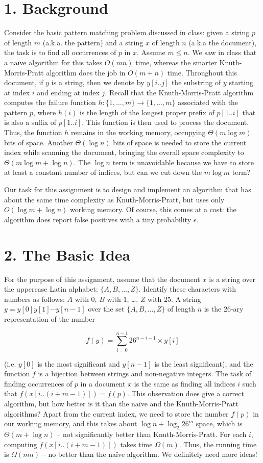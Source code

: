 \documentclass{article}
\begin{document}
\section*{1. Background}
Consider the basic pattern matching problem discussed in class: given a string $p$ of length $m$ (a.k.a. the pattern) and a string $x$ of length $n$ (a.k.a the document), the task is to find all occurrences of $p$ in $x$. Assume $m \leq n$. We saw in class that a naïve algorithm for this takes $O(mn)$ time, whereas the smarter Knuth-Morris-Pratt algorithm does the job in $O(m + n)$ time. Throughout this document, if $y$ is a string, then we denote by $y[i..j]$ the substring of $y$ starting at index $i$ and ending at index $j$. Recall that the Knuth-Morris-Pratt algorithm computes the failure function $h: \{1, \dots, m\} \to \{1, \dots, m\}$ associated with the pattern $p$, where $h(i)$ is the length of the longest proper prefix of $p[1..i]$ that is also a suffix of $p[1..i]$. This function is then used to process the document. Thus, the function $h$ remains in the working memory, occupying $\Theta(m \log m)$ bits of space. Another $\Theta(\log n)$ bits of space is needed to store the current index while scanning the document, bringing the overall space complexity to $\Theta(m \log m + \log n)$. The $\log n$ term is unavoidable because we have to store at least a constant number of indices, but can we cut down the $m \log m$ term?

Our task for this assignment is to design and implement an algorithm that has about the same time complexity as Knuth-Morris-Pratt, but uses only $O(\log m + \log n)$ working memory. Of course, this comes at a cost: the algorithm does report false positives with a tiny probability $\epsilon$.

\section*{2. The Basic Idea}
For the purpose of this assignment, assume that the document $x$ is a string over the uppercase Latin alphabet: $\{A, B, \dots, Z\}$. Identify these characters with numbers as follows: $A$ with $0$, $B$ with $1$, \dots, $Z$ with $25$. A string $y = y[0]y[1]\cdots y[n-1]$ over the set $\{A, B, \dots, Z\}$ of length $n$ is the 26-ary representation of the number

\[
f(y) = \sum_{i=0}^{n-1} 26^{n-i-1} \times y[i]
\]

(i.e. $y[0]$ is the most significant and $y[n-1]$ is the least significant), and the function $f$ is a bijection between strings and non-negative integers. The task of finding occurrences of $p$ in a document $x$ is the same as finding all indices $i$ such that $f(x[i..(i+m-1)]) = f(p)$. This observation does give a correct algorithm, but how better is it than the naïve and the Knuth-Morris-Pratt algorithms? Apart from the current index, we need to store the number $f(p)$ in our working memory, and this takes about $\log n + \log_2 26^m$ space, which is $\Theta(m + \log n)$ – not significantly better than Knuth-Morris-Pratt. For each $i$, computing $f(x[i..(i+m-1)])$ takes time $\Omega(m)$. Thus, the running time is $\Omega(mn)$ – no better than the naïve algorithm. We definitely need more ideas!
\end{document}
